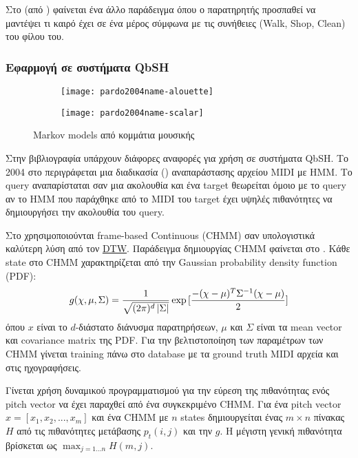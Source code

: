 Στο  (από \cite{wikiHMM}) φαίνεται ένα άλλο παράδειγμα \hmm{} όπου ο παρατηρητής προσπαθεί να μαντέψει τι καιρό έχει σε ένα μέρος σύμφωνα με τις συνήθειες (Walk, Shop, Clean) του φίλου του.

\subsubsection{Εφαρμογή σε συστήματα QbSH}
\begin{figure}
    \centering
    \begin{subfigure}{0.45\linewidth}
        \texttt{[image: pardo2004name-alouette]}
    \end{subfigure}\hfill
    \begin{subfigure}{0.45\linewidth}
        \texttt{[image: pardo2004name-scalar]}
    \end{subfigure}
    \caption{Markov models από κομμάτια μουσικής \protect\cite{pardo2004name}}
    \label{fig:pardo2004name-alouette}
\end{figure}

Στην βιβλιογραφία υπάρχουν διάφορες αναφορές για χρήση \hmm{} σε συστήματα QbSH.
Το 2004 στο \cite{pardo2004name} περιγράφεται μια διαδικασία () αναπαράστασης αρχείου MIDI με HMM.
Το query αναπαρίσταται σαν μια ακολουθία και ένα target θεωρείται όμοιο με το query αν το HMM που παράχθηκε από το MIDI του target έχει υψηλές πιθανότητες να δημιουργήσει την ακολουθία του query.

Στο \cite{jang2005continuous} χρησιμοποιούνται frame-based Continuous \hmm{} (CHMM) σαν υπολογιστικά καλύτερη λύση από τον \hyperref[sub:DTW]{DTW}.
Παράδειγμα δημιουργίας CHMM φαίνεται στο .
Κάθε state στο CHMM χαρακτηρίζεται από την Gaussian probability density function (PDF):
\begin{equation*}
    g(\chi, \mu, \Sigma) = \frac{1}{\sqrt{(2\pi)^d\left\lvert\Sigma\right\rvert}} \exp{[\frac{-(\chi-\mu)^T\Sigma^{-1}(\chi-\mu)}{2}]}
\end{equation*}
όπου $x$ είναι το $d$-διάστατο διάνυσμα παρατηρήσεων, $\mu$ και $\Sigma$ είναι τα mean vector και covariance matrix της PDF.
Για την βελτιστοποίηση των παραμέτρων των CHMM γίνεται training πάνω στο database με τα ground truth MIDI αρχεία και στις ηχογραφήσεις.

Γίνεται χρήση δυναμικού προγραμματισμού για την εύρεση της πιθανότητας ενός pitch vector να έχει παραχθεί από ένα συγκεκριμένο CHMM.
Για ένα pitch vector $x = [x_1, x_2, ..., x_m]$ και ένα CHMM με $n$ states δημιουργείται ένας $m \times n$ πίνακας $H$ από τις πιθανότητες μετάβασης $p_t(i,j)$ και την $g$.
Η μέγιστη γενική πιθανότητα βρίσκεται ως $\max_{j=1...n}{H(m,j)}$.

